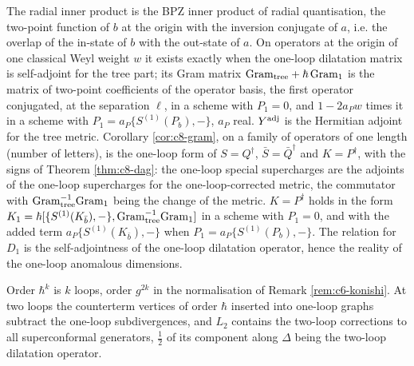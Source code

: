 \begin{remark}[Physics notation: BPZ inner product and $Q^\dagger=S$]
The radial inner product is the BPZ inner product of radial quantisation, the two-point function of $b$ at the origin with the inversion conjugate of $a$, i.e. the overlap of the in-state of $b$ with the out-state of $a$. On operators at the origin of one classical Weyl weight $w$ it exists exactly when the one-loop dilatation matrix is self-adjoint for the tree part; its Gram matrix $\mathrm{Gram}_{\rm tree}+\hbar\,\mathrm{Gram}_1$ is the matrix of two-point coefficients of the operator basis, the first operator conjugated, at the separation $\ell$, in a scheme with $P_1=0$, and $1-2a_Pw$ times it in a scheme with $P_1=a_P\{S^{(1)}(P_b),-\}$, $a_P$ real. $Y^{\rm adj}$ is the Hermitian adjoint for the tree metric. Corollary \ref{cor:c8-gram}, on a family of operators of one length (number of letters), is the one-loop form of $S=Q^\dagger$, $\bar S=\bar Q^\dagger$ and $K=P^\dagger$, with the signs of Theorem \ref{thm:c8-dag}: the one-loop special supercharges are the adjoints of the one-loop supercharges for the one-loop-corrected metric, the commutator with $\mathrm{Gram}_{\rm tree}^{-1}\mathrm{Gram}_1$ being the change of the metric. $K=P^\dagger$ holds in the form $K_1=\hbar[\{S^{(1)}(K_{\bar b}),-\},\mathrm{Gram}_{\rm tree}^{-1}\mathrm{Gram}_1]$ in a scheme with $P_1=0$, and with the added term $a_P\{S^{(1)}(K_{\bar b}),-\}$ when $P_1=a_P\{S^{(1)}(P_b),-\}$. The relation for $D_1$ is the self-adjointness of the one-loop dilatation operator, hence the reality of the one-loop anomalous dimensions.
\end{remark}

\begin{remark}
Order $\hbar^k$ is $k$ loops, order $g^{2k}$ in the normalisation of Remark \ref{rem:c6-konishi}. At two loops the counterterm vertices of order $\hbar$ inserted into one-loop graphs subtract the one-loop subdivergences, and $L_2$ contains the two-loop corrections to all superconformal generators, $\tfrac12$ of its component along $\Delta$ being the two-loop dilatation operator.
\end{remark}
